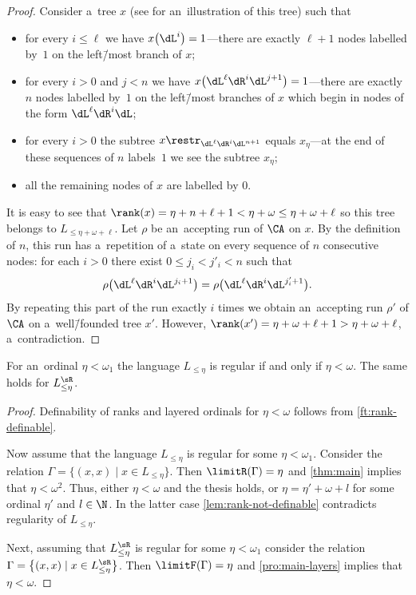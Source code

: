 \documentclass{lmcs}
\numberwithin{equation}{section}
\numberwithin{figure}{section}
\begin{document}
\begin{proof}
	Consider a~tree $x$ (see  for an~illustration of this tree) such that
	\begin{itemize}
	\item for every $i\leq \ell$ we have $x\big(\dL^i\big)=1$---there are exactly $\ell{+}1$ nodes labelled by~$1$ on the left\=/most branch of $x$;
	\item for every $i>0$ and $j<n$ we have $x\big(\dL^{\ell}\dR^i\dL^{j+1}\big)=1$---there are exactly $n$ nodes labelled by~$1$ on the left\=/most branches of $x$ which begin in nodes of the form $\dL^{\ell}\dR^i\dL$;
	\item for every $i>0$ the subtree $x\restr_{\dL^{\ell}\dR^i\dL^{n+1}}$ equals $x_\eta$---at the end of these sequences of $n$ labels~$1$ we see the subtree $x_\eta$;
	\item all the remaining nodes of $x$ are labelled by $0$.
	\end{itemize}
	\noindent %
	It is easy to see that $\rank(x)=\eta+n+\ell+1<\eta+\omega\leq\eta+\omega+\ell$ so this tree belongs to $L_{\leq \eta+\omega+\ell}$.
	Let $\rho$ be an~accepting run of $\CA$ on $x$.
	By the definition of $n$, this run has a~repetition of a~state on every sequence of $n$ consecutive nodes: for each $i>0$ there exist $0\leq j_i<j'_i<n$ such that
	\[\rho\big(\dL^{\ell}\dR^i\dL^{j_i+1}\big)=\rho\big(\dL^{\ell}\dR^i\dL^{j'_i+1}\big).\]
	By repeating this part of the run exactly $i$ times we obtain an~accepting run $\rho'$ of $\CA$ on a~well\=/founded tree $x'$.
	However, $\rank(x')=\eta+\omega+\ell+1>\eta+\omega+\ell$, a~contradiction.
\end{proof}

\begin{cor}\label{cor:not-expressible}
	For an~ordinal $\eta<\omega_1$ the language $L_{\leq\eta}$ is regular if and only if $\eta<\omega$.
	The same holds for $L^{\sR}_{\leq\eta}$.
\end{cor}

\begin{proof}
	Definability of ranks and layered ordinals for $\eta<\omega$ follows from \cref{ft:rank-definable}.

	Now assume that the language $L_{\leq\eta}$ is regular for some $\eta<\omega_1$.
	Consider the relation $\Gamma=\big\{(x,x)\mid x\in L_{\leq\eta}\big\}$.
	Then $\limitR(\Gamma)=\eta$ and \cref{thm:main} implies that $\eta <\omega^2$.
	Thus, either $\eta<\omega$ and the thesis holds, or $\eta=\eta'+\omega+l$ for some ordinal $\eta'$ and $l\in\N$.
	In the latter case \cref{lem:rank-not-definable} contradicts regularity of $L_{\leq\eta}$.

	Next, assuming that $L^{\sR}_{\leq\eta}$ is regular for some $\eta<\omega_1$ consider the relation $\Gamma=\big\{(x,x)\mid x\in L^{\sR}_{\leq\eta}\big\}$.
	Then $\limitF(\Gamma)=\eta$ and \cref{pro:main-layers} implies that $\eta <\omega$.
\end{proof}
\end{document}
